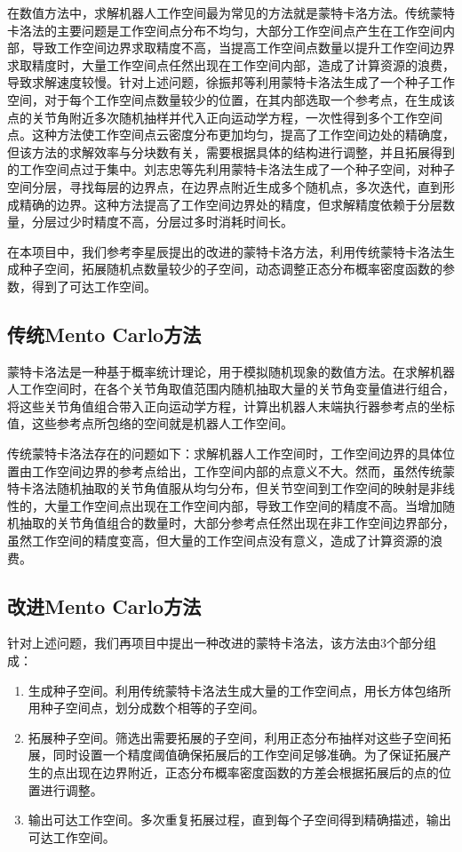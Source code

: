 在数值方法中，求解机器人工作空间最为常见的方法就是蒙特卡洛方法。传统蒙特卡洛法的主要问题是工作空间点分布不均匀，大部分工作空间点产生在工作空间内部，导致工作空间边界求取精度不高，当提高工作空间点数量以提升工作空间边界求取精度时，大量工作空间点任然出现在工作空间内部，造成了计算资源的浪费，导致求解速度较慢。针对上述问题，徐振邦等利用蒙特卡洛法生成了一个种子工作空间，对于每个工作空间点数量较少的位置，在其内部选取一个参考点，在生成该点的关节角附近多次随机抽样并代入正向运动学方程，一次性得到多个工作空间点。这种方法使工作空间点云密度分布更加均匀，提高了工作空间边处的精确度，但该方法的求解效率与分块数有关，需要根据具体的结构进行调整，并且拓展得到的工作空间点过于集中。刘志忠等先利用蒙特卡洛法生成了一个种子空间，对种子空间分层，寻找每层的边界点，在边界点附近生成多个随机点，多次迭代，直到形成精确的边界。这种方法提高了工作空间边界处的精度，但求解精度依赖于分层数量，分层过少时精度不高，分层过多时消耗时间长。

在本项目中，我们参考李星辰提出的改进的蒙特卡洛方法，利用传统蒙特卡洛法生成种子空间，拓展随机点数量较少的子空间，动态调整正态分布概率密度函数的参数，得到了可达工作空间。

\subsection{传统Mento Carlo方法}
蒙特卡洛法是一种基于概率统计理论，用于模拟随机现象的数值方法。在求解机器人工作空间时，在各个关节角取值范围内随机抽取大量的关节角变量值进行组合，将这些关节角值组合带入正向运动学方程，计算出机器人末端执行器参考点的坐标值，这些参考点所包络的空间就是机器人工作空间。

传统蒙特卡洛法存在的问题如下：求解机器人工作空间时，工作空间边界的具体位置由工作空间边界的参考点给出，工作空间内部的点意义不大。然而，虽然传统蒙特卡洛法随机抽取的关节角值服从均匀分布，但关节空间到工作空间的映射是非线性的，大量工作空间点出现在工作空间内部，导致工作空间的精度不高。当增加随机抽取的关节角值组合的数量时，大部分参考点任然出现在非工作空间边界部分，虽然工作空间的精度变高，但大量的工作空间点没有意义，造成了计算资源的浪费。

\subsection{改进Mento Carlo方法}
针对上述问题，我们再项目中提出一种改进的蒙特卡洛法，该方法由3个部分组成：
\begin{enumerate}
    \item 生成种子空间。利用传统蒙特卡洛法生成大量的工作空间点，用长方体包络所用种子空间点，划分成数个相等的子空间。
    \item 拓展种子空间。筛选出需要拓展的子空间，利用正态分布抽样对这些子空间拓展，同时设置一个精度阈值确保拓展后的工作空间足够准确。为了保证拓展产生的点出现在边界附近，正态分布概率密度函数的方差会根据拓展后的点的位置进行调整。 
    \item 输出可达工作空间。多次重复拓展过程，直到每个子空间得到精确描述，输出可达工作空间。
\end{enumerate}

